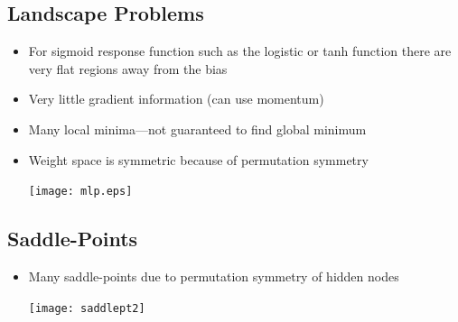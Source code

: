 \begin{slide}
\section[-1.5]{Landscape Problems}

\begin{PauseHighLight}

\begin{itemize}\squeeze
\item For sigmoid response function such as the logistic or tanh
  function there are very flat regions away from the bias\pause
\item Very little gradient information (can use momentum)\pause
\item Many local minima\pause---not guaranteed to find global minimum\pause
\item Weight space is symmetric because of permutation symmetry
  \begin{center}
    \texttt{[image: mlp.eps]}\pause
  \end{center}
\end{itemize}

\end{PauseHighLight}
\end{slide}


\begin{slide}
\section[-2]{Saddle-Points}

\pb
\begin{itemize}
\item Many saddle-points due to permutation symmetry of hidden nodes\pauseh
  \begin{center}
    \texttt{[image: saddlept2]}\pauseh
  \end{center}
\end{itemize}

\end{slide}


